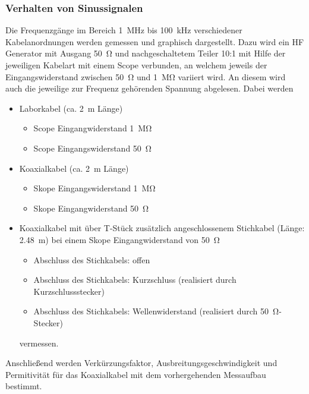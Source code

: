 \documentclass[a4paper,twoside,final]{article}
\begin{document}
\subsubsection{Verhalten von Sinussignalen}
Die Frequenzgänge im Bereich \SI{1}{\mega\hertz} bis \SI{100}{\kilo\hertz} verschiedener Kabelanordnungen werden gemessen und graphisch dargestellt. Dazu wird ein HF Generator mit Ausgang \SI{50}{\ohm} und nachgeschaltetem Teiler 10:1 mit Hilfe der jeweiligen Kabelart mit einem Scope verbunden, an welchem jeweils der Eingangswiderstand zwischen \SI{50}{\ohm} und \SI{1}{\mega\ohm} variiert wird. An diesem wird auch die jeweilige zur Frequenz gehörenden Spannung abgelesen. Dabei werden
\begin{itemize}
  \item Laborkabel (ca. \SI{2}{\metre} Länge)
  \begin{itemize}
    \item Scope Eingangwiderstand \SI{1}{\mega\ohm}
    \item Scope Eingangswiderstand \SI{50}{\ohm}
  \end{itemize}
  \item{Koaxialkabel (ca. \SI{2}{\metre} Länge)}
  \begin{itemize}
    \item Skope Eingangswiderstand \SI{1}{\mega\ohm}
    \item Skope Eingangwiderstand \SI{50}{\ohm}
  \end{itemize}
  \item Koaxialkabel mit über T-Stück zusätzlich angeschlossenem Stichkabel (Länge: \SI{2,48}{\metre}) bei einem Skope Eingangwiderstand von \SI{50}{\ohm}
  \begin{itemize}
    \item Abschluss des Stichkabels: offen
    \item Abschluss des Stichkabels: Kurzschluss (realisiert durch Kurzschlussstecker)
    \item Abschluss des Stichkabels: Wellenwiderstand (realisiert durch \SI{50}{\ohm}- Stecker)
  \end{itemize}
  vermessen.
\end{itemize}

Anschließend werden Verkürzungsfaktor, Ausbreitungsgeschwindigkeit und Permitivität für das Koaxialkabel mit dem vorhergehenden Messaufbau bestimmt.
\end{document}
